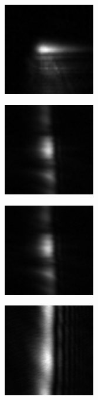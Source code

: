 \begin{figure}[ht]
  \centering
  \begin{subfigure}[b]{4cm}
    \includegraphics[width=4cm,keepaspectratio]{interference/figures/move/321-1.png}
    \caption{}
  \end{subfigure}
  \begin{subfigure}[b]{4cm}
    \includegraphics[width=4cm,keepaspectratio]{interference/figures/move/321-2.png}
    \caption{}
  \end{subfigure}
  \begin{subfigure}[b]{4cm}
    \includegraphics[width=4cm,keepaspectratio]{interference/figures/move/321-3.png}
    \caption{}
  \end{subfigure}
  \begin{subfigure}[b]{4cm}
    \includegraphics[width=4cm,keepaspectratio]{interference/figures/move/321-7.png}
    \caption{}

\end{subfigure}
\end{figure}
